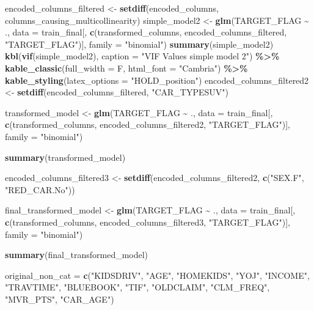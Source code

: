 \documentclass[
]{article}
\newenvironment{Shaded}{\begin{snugshade}}{\end{snugshade}}
\newcommand{\AttributeTok}[1]{\textcolor[rgb]{0.13,0.29,0.53}{#1}}
\newcommand{\FunctionTok}[1]{\textcolor[rgb]{0.13,0.29,0.53}{\textbf{#1}}}
\newcommand{\NormalTok}[1]{#1}
\newcommand{\OtherTok}[1]{\textcolor[rgb]{0.56,0.35,0.01}{#1}}
\newcommand{\SpecialCharTok}[1]{\textcolor[rgb]{0.81,0.36,0.00}{\textbf{#1}}}
\newcommand{\StringTok}[1]{\textcolor[rgb]{0.31,0.60,0.02}{#1}}
\begin{document}
\begin{Shaded}
\begin{Highlighting}[]
\NormalTok{encoded\_columns\_filtered }\OtherTok{\textless{}{-}} \FunctionTok{setdiff}\NormalTok{(encoded\_columns, columns\_causing\_multicollinearity)}
\NormalTok{simple\_model2 }\OtherTok{\textless{}{-}} \FunctionTok{glm}\NormalTok{(TARGET\_FLAG }\SpecialCharTok{\textasciitilde{}}\NormalTok{ ., }\AttributeTok{data =}\NormalTok{ train\_final[, }\FunctionTok{c}\NormalTok{(transformed\_columns, encoded\_columns\_filtered, }\StringTok{"TARGET\_FLAG"}\NormalTok{)], }\AttributeTok{family =} \StringTok{"binomial"}\NormalTok{)}
\FunctionTok{summary}\NormalTok{(simple\_model2)}
\FunctionTok{kbl}\NormalTok{(}\FunctionTok{vif}\NormalTok{(simple\_model2), }\AttributeTok{caption =} \StringTok{"VIF Values simple model 2"}\NormalTok{) }\SpecialCharTok{\%\textgreater{}\%}
  \FunctionTok{kable\_classic}\NormalTok{(}\AttributeTok{full\_width =}\NormalTok{ F, }\AttributeTok{html\_font =} \StringTok{"Cambria"}\NormalTok{) }\SpecialCharTok{\%\textgreater{}\%}
  \FunctionTok{kable\_styling}\NormalTok{(}\AttributeTok{latex\_options =} \StringTok{"HOLD\_position"}\NormalTok{)}
\NormalTok{encoded\_columns\_filtered2 }\OtherTok{\textless{}{-}} \FunctionTok{setdiff}\NormalTok{(encoded\_columns\_filtered, }\StringTok{"CAR\_TYPESUV"}\NormalTok{)}

\NormalTok{transformed\_model }\OtherTok{\textless{}{-}} \FunctionTok{glm}\NormalTok{(TARGET\_FLAG }\SpecialCharTok{\textasciitilde{}}\NormalTok{ ., }\AttributeTok{data =}\NormalTok{ train\_final[, }\FunctionTok{c}\NormalTok{(transformed\_columns, encoded\_columns\_filtered2, }\StringTok{"TARGET\_FLAG"}\NormalTok{)], }\AttributeTok{family =} \StringTok{"binomial"}\NormalTok{)}

\FunctionTok{summary}\NormalTok{(transformed\_model)}

\NormalTok{encoded\_columns\_filtered3 }\OtherTok{\textless{}{-}} \FunctionTok{setdiff}\NormalTok{(encoded\_columns\_filtered2, }\FunctionTok{c}\NormalTok{(}\StringTok{"SEX.F"}\NormalTok{, }\StringTok{"RED\_CAR.No"}\NormalTok{))}

\NormalTok{final\_transformed\_model }\OtherTok{\textless{}{-}} \FunctionTok{glm}\NormalTok{(TARGET\_FLAG }\SpecialCharTok{\textasciitilde{}}\NormalTok{ ., }\AttributeTok{data =}\NormalTok{ train\_final[, }\FunctionTok{c}\NormalTok{(transformed\_columns, encoded\_columns\_filtered3, }\StringTok{"TARGET\_FLAG"}\NormalTok{)], }\AttributeTok{family =} \StringTok{"binomial"}\NormalTok{)}

\FunctionTok{summary}\NormalTok{(final\_transformed\_model)}

\NormalTok{original\_non\_cat }\OtherTok{=} \FunctionTok{c}\NormalTok{(}\StringTok{"KIDSDRIV"}\NormalTok{, }\StringTok{"AGE"}\NormalTok{, }\StringTok{"HOMEKIDS"}\NormalTok{, }\StringTok{"YOJ"}\NormalTok{, }\StringTok{"INCOME"}\NormalTok{, }\StringTok{"TRAVTIME"}\NormalTok{, }\StringTok{"BLUEBOOK"}\NormalTok{, }\StringTok{"TIF"}\NormalTok{, }
                       \StringTok{"OLDCLAIM"}\NormalTok{, }\StringTok{"CLM\_FREQ"}\NormalTok{, }\StringTok{"MVR\_PTS"}\NormalTok{, }
                      \StringTok{"CAR\_AGE"}\NormalTok{)}


\end{Highlighting}
\end{Shaded}
\end{document}
